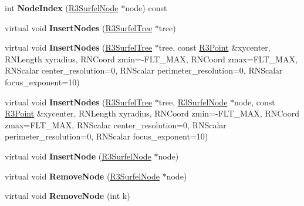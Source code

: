 \begin{DoxyCompactItemize}
\item 
int {\bfseries Node\+Index} (\hyperlink{class_r3_surfel_node}{R3\+Surfel\+Node} $\ast$node) const \hypertarget{class_r3_surfel_node_set_a536f28ec333a413bf670cdd9d6d7717f}{}\label{class_r3_surfel_node_set_a536f28ec333a413bf670cdd9d6d7717f}

\item 
virtual void {\bfseries Insert\+Nodes} (\hyperlink{class_r3_surfel_tree}{R3\+Surfel\+Tree} $\ast$tree)\hypertarget{class_r3_surfel_node_set_ae9cc28f309311d49f91e682fd9ce6b06}{}\label{class_r3_surfel_node_set_ae9cc28f309311d49f91e682fd9ce6b06}

\item 
virtual void {\bfseries Insert\+Nodes} (\hyperlink{class_r3_surfel_tree}{R3\+Surfel\+Tree} $\ast$tree, const \hyperlink{class_r3_point}{R3\+Point} \&xycenter, R\+N\+Length xyradius, R\+N\+Coord zmin=-\/F\+L\+T\+\_\+\+M\+AX, R\+N\+Coord zmax=F\+L\+T\+\_\+\+M\+AX, R\+N\+Scalar center\+\_\+resolution=0, R\+N\+Scalar perimeter\+\_\+resolution=0, R\+N\+Scalar focus\+\_\+exponent=10)\hypertarget{class_r3_surfel_node_set_abdbe15cbf723f84d1673ea447800af6b}{}\label{class_r3_surfel_node_set_abdbe15cbf723f84d1673ea447800af6b}

\item 
virtual void {\bfseries Insert\+Nodes} (\hyperlink{class_r3_surfel_tree}{R3\+Surfel\+Tree} $\ast$tree, \hyperlink{class_r3_surfel_node}{R3\+Surfel\+Node} $\ast$node, const \hyperlink{class_r3_point}{R3\+Point} \&xycenter, R\+N\+Length xyradius, R\+N\+Coord zmin=-\/F\+L\+T\+\_\+\+M\+AX, R\+N\+Coord zmax=F\+L\+T\+\_\+\+M\+AX, R\+N\+Scalar center\+\_\+resolution=0, R\+N\+Scalar perimeter\+\_\+resolution=0, R\+N\+Scalar focus\+\_\+exponent=10)\hypertarget{class_r3_surfel_node_set_a64bfc30a1958c259a041c196c475dcb2}{}\label{class_r3_surfel_node_set_a64bfc30a1958c259a041c196c475dcb2}

\item 
virtual void {\bfseries Insert\+Node} (\hyperlink{class_r3_surfel_node}{R3\+Surfel\+Node} $\ast$node)\hypertarget{class_r3_surfel_node_set_aebc08e3077a1a52290ab2227834ef128}{}\label{class_r3_surfel_node_set_aebc08e3077a1a52290ab2227834ef128}

\item 
virtual void {\bfseries Remove\+Node} (\hyperlink{class_r3_surfel_node}{R3\+Surfel\+Node} $\ast$node)\hypertarget{class_r3_surfel_node_set_a286a1a45772626094f2280f455bc8baf}{}\label{class_r3_surfel_node_set_a286a1a45772626094f2280f455bc8baf}

\item 
virtual void {\bfseries Remove\+Node} (int k)\hypertarget{class_r3_surfel_node_set_a4809f875ada7b63cddf46a793987b235}{}\label{class_r3_surfel_node_set_a4809f875ada7b63cddf46a793987b235}


\end{DoxyCompactItemize}
